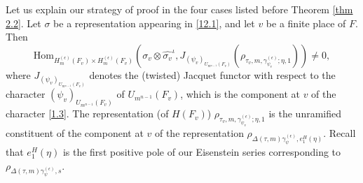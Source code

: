 \documentclass[12pts]{amsart}
\newcommand{\Hom}{{\mathrm{Hom}}}
\begin{document}
Let us explain our strategy of proof in the four cases listed before Theorem \ref{thm 2.2}. Let $\sigma$ be a representation appearing in \eqref{12.1}, and let $v$ be a finite place of $F$. Then
\begin{equation}\label{12.2}
\Hom_{H^{(\epsilon)}_m(F_v)\times H^{(\epsilon)}_m(F_v)}(\sigma_v\otimes \hat{\sigma_v}^\iota,J_{(\psi_v)_{U_{m^{n-1}}(F_v)}}(\rho_{\tau_v,m,\gamma_{\psi_v}^{(\epsilon)};\eta,1}))\neq 0,
\end{equation}
where $J_{(\psi_v)_{U_{m^{n-1}}(F_v)}}$ denotes the (twisted) Jacquet functor with respect to the character $(\psi_v)_{U_{m^{n-1}}(F_v)}$ of $U_{m^{n-1}}(F_v)$, which is the component at $v$ of the character \eqref{1.3}. The representation (of $H(F_v)$) $\rho_{\tau_v,m,\gamma_{\psi_v}^{(\epsilon)};\eta,1}$ is the unramified constituent of the component at $v$ of the representation $\rho_{\Delta(\tau,m)\gamma_\psi^{(\epsilon)}, e_1^H(\eta)}$. Recall that $e_1^H(\eta)$ is the first positive pole of our Eisenstein series corresponding to $\rho_{\Delta(\tau,m)\gamma_\psi^{(\epsilon)}, s}$.
\end{document}
